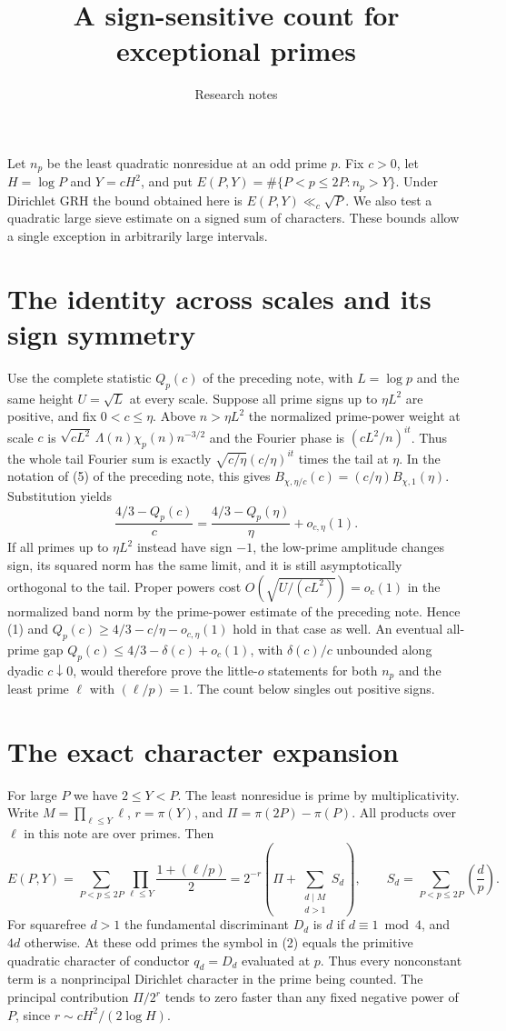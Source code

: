 \documentclass[11pt]{article}
\title{A sign-sensitive count for exceptional primes}
\author{Research notes}
\date{}
\newcommand{\leg}[2]{\left(\frac{#1}{#2}\right)}
\begin{document}
\maketitle
Let $n_p$ be the least quadratic nonresidue at an odd prime $p$. Fix
$c>0$, let $H=\log P$ and $Y=cH^2$, and put
$E(P,Y)=\#\{P<p\le2P:n_p>Y\}$. Under Dirichlet GRH the bound obtained
here is $E(P,Y)\ll_c\sqrt P$. We also test a quadratic large sieve
estimate on a signed sum of characters. These bounds allow a single
exception in arbitrarily large intervals.

\section{The identity across scales and its sign symmetry}
Use the complete statistic $Q_p(c)$ of the preceding note, with
$L=\log p$ and the same height $U=\sqrt L$ at every scale.
Suppose all prime signs up to $\eta L^2$ are positive, and fix
$0<c\le\eta$. Above $n>\eta L^2$ the normalized prime-power weight
at scale $c$ is $\sqrt{cL^2}\,\Lambda(n)\chi_p(n)n^{-3/2}$ and the
Fourier phase is $(cL^2/n)^{it}$. Thus the whole tail Fourier sum is
exactly $\sqrt{c/\eta}(c/\eta)^{it}$ times the tail at $\eta$.
In the notation of (5) of the preceding note, this gives
$B_{\chi,\eta/c}(c)=(c/\eta)B_{\chi,1}(\eta)$. Substitution yields
\[
 \frac{4/3-Q_p(c)}{c}=\frac{4/3-Q_p(\eta)}{\eta}+o_{c,\eta}(1).
 \tag{1}
\]
If all primes up to $\eta L^2$ instead have sign $-1$, the low-prime
amplitude changes sign, its squared norm has the same limit, and it
is still asymptotically orthogonal to the tail. Proper powers cost
$O(\sqrt{U/(cL^2)})=o_c(1)$ in the normalized band norm by the
prime-power estimate of the preceding note. Hence (1) and
$Q_p(c)\ge4/3-c/\eta-o_{c,\eta}(1)$ hold in that case as well.
An eventual all-prime gap $Q_p(c)\le4/3-\delta(c)+o_c(1)$, with
$\delta(c)/c$ unbounded along dyadic $c\downarrow0$, would therefore
prove the little-$o$ statements for both $n_p$ and the least prime
$\ell$ with $(\ell/p)=1$. The count below singles out positive signs.

\section{The exact character expansion}
For large $P$ we have $2\le Y<P$. The least nonresidue is prime by
multiplicativity. Write $M=\prod_{\ell\le Y}\ell$, $r=\pi(Y)$, and
$\Pi=\pi(2P)-\pi(P)$. All products over $\ell$ in this note are over primes.
Then
\[
 E(P,Y)=\sum_{P<p\le2P}\prod_{\ell\le Y}\frac{1+(\ell/p)}2
 =2^{-r}\left(\Pi+\sum_{\substack{d\mid M\\d>1}}S_d\right),
 \qquad S_d=\sum_{P<p\le2P}\leg d p .
 \tag{2}
\]
For squarefree $d>1$ the fundamental discriminant $D_d$ is $d$ if
$d\equiv1\bmod4$, and $4d$ otherwise. At these odd primes the
symbol in (2) equals the primitive quadratic character of conductor
$q_d=D_d$ evaluated at $p$. Thus every nonconstant term is a
nonprincipal Dirichlet character in the prime being counted.
The principal contribution $\Pi/2^r$ tends to zero faster than any
fixed negative power of $P$, since $r\sim cH^2/(2\log H)$.
\end{document}
